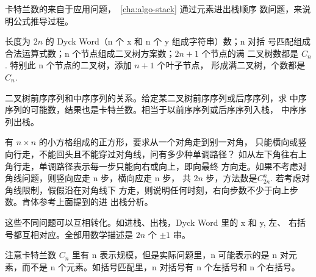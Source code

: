 卡特兰数的来自于应用问题，~\ref{cha:algo-stack} 通过元素进出栈顺序
数问题，来说明公式推导过程。

长度为 $2n$ 的 Dyck Word（n 个 x 和 n 个 y 组成字符串）数；n 对括
号匹配组成合法运算式数；n 个节点组成二叉树方案数；$2n+1$ 个节点的满
二叉树数都是 $C_n$. 特别此 n 个节点的二叉树，添加 $n+1$ 个叶子节点，
形成满二叉树，个数都是 $C_n$.

二叉树前序序列和中序序列的关系。给定某二叉树前序序列或后序序列，求
中序序列的可能数，结果也是卡特兰数。相当于以前序序列或后序序列入栈，
中序序列出栈。

有 $n \times n$ 的小方格组成的正方形，要求从一个对角走到别一对角，
只能横向或竖向行走，不能回头且不能穿过对角线，问有多少种单调路径？
如从左下角往右上角行走，单调路径表示每一步只能向右或向上，即向最终
方向走。如果不考虑对角线问题，则竖向应走 n 步，横向应走 n 步，
共 $2n$ 步，方法数是$C_{2n}^n$. 若考虑对角线限制，假假沿在对角线下
方走，则说明任何时刻，右向步数不少于向上步数。肯体参考上面提到的进
出栈分析。

这些不同问题可以互相转化。如进栈、出栈，Dyck Word 里的 x 和 y, 左、
右括号都互相对应。全部用数学描述是 $2n$ 个 $\pm 1$ 串。

注意卡特兰数 $C_n$ 里有 n 表示规模，但是实际问题里，n 可能表示的是
n 对元素，而不是 n 个元素。如括号匹配里，n 对括号有 n 个左括号和 n
个右括号。

